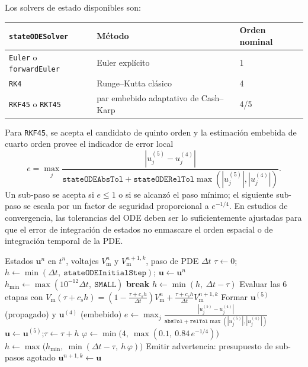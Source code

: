 \documentclass[11pt,a4paper]{article}
\newcommand{\code}[1]{\texttt{\small #1}}
\newcommand{\Vm}{V_{\text{m}}}
\begin{document}
Los solvers de estado disponibles son:
\begin{center}
\begin{tabular}{@{}lll@{}}
\toprule
\code{stateODESolver} & Método & Orden nominal \\
\midrule
\code{Euler} o \code{forwardEuler} & Euler explícito & 1 \\
\code{RK4} & Runge--Kutta clásico & 4 \\
\code{RKF45} o \code{RKT45} & par embebido adaptativo de Cash–Karp  & 4/5 \\
\bottomrule
\end{tabular}
\end{center}
Para \code{RKF45}, se acepta el candidato de quinto orden y la estimación embebida de cuarto
orden provee el indicador de error local
\begin{equation}
  e =
  \max_j
  \frac{|u^{(5)}_j-u^{(4)}_j|}
       {\texttt{stateODEAbsTol}+
        \texttt{stateODERelTol}\max(|u^{(5)}_j|,|u^{(4)}_j|)}.
\end{equation}
Un sub-paso se acepta si $e\le 1$ o si se alcanzó el paso mínimo; el siguiente sub-paso se
escala por un factor de seguridad proporcional a $e^{-1/4}$. En estudios de convergencia,
las tolerancias del ODE deben ser lo suficientemente ajustadas para que el error de
integración de estados no enmascare el orden espacial o de integración temporal de la PDE.

\begin{algorithm}[h!]
	\caption{Control de sub-paso adaptativo del par embebido 5(4) dentro de un
		paso de tiempo de la PDE}
	\label{alg:rkf45}
	\begin{algorithmic}[1]
		\Require Estados $\mathbf{u}^n$ en $t^n$, voltajes $\Vm^n$ y $\Vm^{n+1,k}$, paso de PDE $\Delta t$
		\State $\tau \gets 0$;\quad
		$h \gets \min(\Delta t,\ \texttt{stateODEInitialStep})$;\quad
		$\mathbf{u} \gets \mathbf{u}^n$
		\State $h_{\min} \gets \max(10^{-12}\Delta t,\ \texttt{SMALL})$
		 \State \textbf{break} \EndIf
		\State $h \gets \min(h,\ \Delta t-\tau)$
		\State Evaluar las 6 etapas con $\Vm(\tau+c_sh)=(1-\tfrac{\tau+c_sh}{\Delta t})\Vm^n+\tfrac{\tau+c_sh}{\Delta t}\Vm^{n+1,k}$
		\State Formar $\mathbf{u}^{(5)}$ (propagado) y $\mathbf{u}^{(4)}$ (embebido)
		\State $e \gets \displaystyle\max_{j}
		\frac{|u^{(5)}_j-u^{(4)}_j|}
		{\texttt{absTol}+\texttt{relTol}\max(|u^{(5)}_j|,|u^{(4)}_j|)}$
		\State $\mathbf{u} \gets \mathbf{u}^{(5)}$;\quad $\tau \gets \tau + h$
		\Else
		\EndIf
		\State $\varphi \gets \min\!\big(4,\ \max(0.1,\ 0.84\,e^{-1/4})\big)$
		\State $h \gets \max\!\big(h_{\min},\ \min(\Delta t-\tau,\ h\,\varphi)\big)$
		\EndFor
		\State Emitir advertencia: presupuesto de sub-pasos agotado
		\EndIf
		\Ensure $\mathbf{u}^{n+1,k} \gets \mathbf{u}$
	\end{algorithmic}
\end{algorithm}
\end{document}
